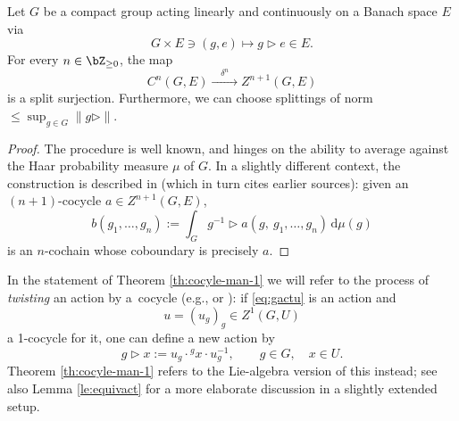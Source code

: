 \begin{Lemma}\label{le:cansplit}
 Let $G$ be a compact group acting linearly and continuously on a Banach space $E$ via
 \begin{equation*}
 G\times E\ni (g,e)\mapsto g\triangleright e\in E.
 \end{equation*}
 For every $n\in \bZ_{\ge 0}$, the map
 \begin{equation*}%
 C^n(G,E)\xrightarrow{\quad\delta^n\quad} Z^{n+1}(G,E)
 \end{equation*}
 is a split surjection. Furthermore, we can choose splittings of norm $\le \sup_{g\in G}\|g\triangleright\|$.
\end{Lemma}
\begin{proof}
 The procedure is well known, and hinges on the ability to average against the Haar probability measure $\mu$ of $G$. In a slightly different context, the construction is described in \cite[Proof of Theorem~2.3]{moo-12} (which in turn cites earlier sources): given an $(n+1)$-cocycle ${a\in Z^{n+1}(G,E)}$,
 \begin{equation}\label{eq:splitgpcoc}
 b(g_1,\dots,g_{n}):=\int_{G}g^{-1}\triangleright a(g,\ g_1,\dots,g_n)\, \mathrm{d}\mu(g)
 \end{equation}
 is an $n$-cochain whose coboundary is precisely $a$.
\end{proof}

In the statement of Theorem \ref{th:cocyle-man-1} we will refer to the process of {\it twisting} an action by a~cocycle (e.g., \cite[Section~I.5.3, Example 2 preceding Proposition 34]{ser-gal} or \cite[Definition X.1.4, equation~(8)]{tak2}): if \eqref{eq:gactu} is an action and
\begin{equation*}
 u = (u_g)_g\in Z^1(G,U)
\end{equation*}
a 1-cocycle for it, one can define a new action by
\begin{equation*}
 g\triangleright x := u_g \cdot {}^g x \cdot u_g^{-1},\qquad g\in G,\quad x\in U.
\end{equation*}
Theorem \ref{th:cocyle-man-1} refers to the Lie-algebra version of this instead; see also Lemma \ref{le:equivact} for a more elaborate discussion in a slightly extended setup.

